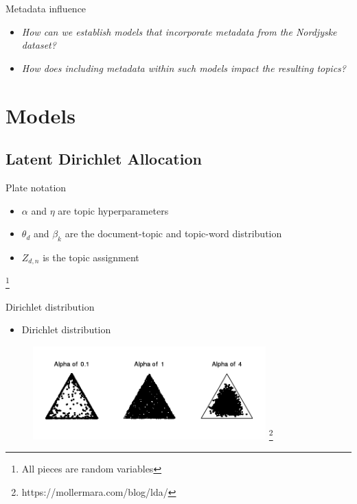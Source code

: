 \begin{frame}{\insertsection}{Metadata influence}
	\begin{itemize}
		\item \textit{How can we establish models that incorporate metadata from the Nordjyske dataset?}
		\item \textit{How does including metadata within such models impact the resulting topics?}
	\end{itemize}
\end{frame}

\section{Models}

\subsection{Latent Dirichlet Allocation}

\begin{frame}{\insertsubsection}{Plate notation}
	\begin{figure}
		\centering
		\resizebox{\textwidth}{!}{%
			
		}
	\end{figure}
	\begin{itemize}
		\item $\alpha$ and $\eta$ are topic hyperparameters
		\item $\theta_d$ and $\beta_k$ are the document-topic and topic-word distribution
		\item $Z_{d,n}$ is the topic assignment 
	\end{itemize}
	\let\thefootnote\relax\footnote{\tiny{All pieces are random variables}}
\end{frame}


\begin{frame}{\insertsubsection}{Dirichlet distribution}
	\begin{itemize}
		\item Dirichlet distribution
	\end{itemize}
	\begin{figure}
		\includegraphics[width=0.8\textwidth]{figures/dirich.png}
		\let\thefootnote\relax\footnote{\tiny{https://mollermara.com/blog/lda/}}
	\end{figure}
\end{frame}

